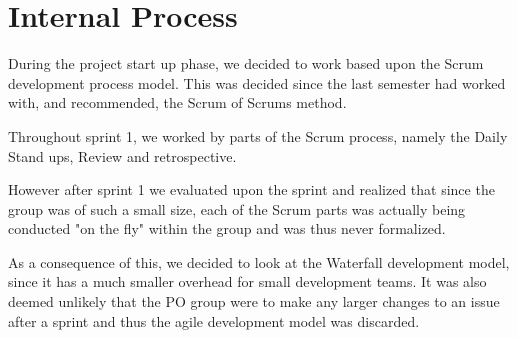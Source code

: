 \section{Internal Process}
During the project start up phase, we decided to work based upon the Scrum development process model.
This was decided since the last semester had worked with, and recommended, the Scrum of Scrums method. 

Throughout sprint 1, we worked by parts of the Scrum process, namely the Daily Stand ups, Review and retrospective. 

However after sprint 1 we evaluated upon the sprint and realized that since the group was of such a small size, each of the Scrum parts was actually being conducted "on the fly" within the group and was thus never formalized. 

As a consequence of this, we decided to look at the Waterfall development model, since it has a much smaller overhead for small development teams. 
It was also deemed unlikely that the PO group were to make any larger changes to an issue after a sprint and thus the agile development model was discarded.






